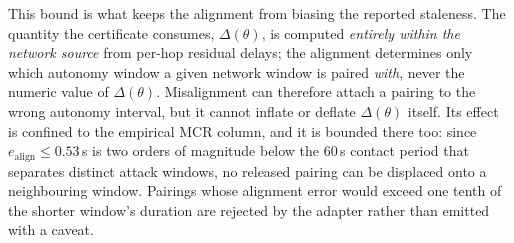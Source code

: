 This bound is what keeps the alignment from biasing the reported staleness. The
quantity the certificate consumes, $\Delta(\theta)$, is computed \emph{entirely
within the network source} from per-hop residual delays; the alignment
determines only which autonomy window a given network window is paired
\emph{with}, never the numeric value of $\Delta(\theta)$. Misalignment can
therefore attach a pairing to the wrong autonomy interval, but it cannot inflate
or deflate $\Delta(\theta)$ itself. Its effect is confined to the empirical MCR
column, and it is bounded there too: since $e_{\mathrm{align}}\le0.53$\,s is two
orders of magnitude below the $60$\,s contact period that separates distinct
attack windows, no released pairing can be displaced onto a neighbouring window.
Pairings whose alignment error would exceed one tenth of the shorter window's
duration are rejected by the adapter rather than emitted with a caveat.

